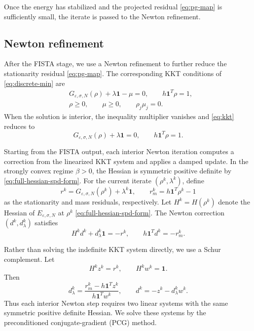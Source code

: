 \documentclass[11pt]{article}
\newcommand{\eps}{\varepsilon}
\newcommand{\sig}{\sigma}
\theoremstyle{plain}
\theoremstyle{definition}
\numberwithin{equation}{section}
\begin{document}
Once the energy has stabilized and the projected residual \eqref{eq:pg-map} is
sufficiently small, the iterate is passed to the Newton refinement.


\subsection{Newton refinement}
\label{subsec:Newton-PCG}

After the FISTA stage, we use a Newton refinement to further reduce
the stationarity residual \eqref{eq:pg-map}. The corresponding KKT conditions of
\eqref{eq:discrete-min} are 
\begin{equation}
\label{eq:kkt}
\begin{aligned}
& G_{\eps,\sig,N}(\rho)+\lambda\bm1-\mu=0,
\qquad
h\bm1^T\rho=1,\\
& \rho\ge0,\qquad
\mu\ge0,\qquad
\rho_j\mu_j=0.
\end{aligned}
\end{equation}
When the solution is interior, the inequality multiplier vanishes and
\eqref{eq:kkt} reduces to
\begin{equation}
\label{eq:interior-kkt}
G_{\eps,\sig,N}(\rho)+\lambda\bm1=0,
\qquad
h\bm1^T\rho=1.
\end{equation}

Starting from the FISTA output, each interior Newton iteration
computes a correction from the linearized KKT system and applies a
damped update. In the strongly convex regime $\beta>0$, the Hessian
is symmetric positive definite by
\eqref{eq:full-hessian-spd-form}. For the current iterate
$(\rho^k,\lambda^k)$, define
\[
r^k
=
G_{\eps,\sig,N}(\rho^k)+\lambda^k\bm1,
\qquad
r_m^k
=
h\bm1^T\rho^k-1
\]
as the stationarity and mass residuals, respectively.
Let $H^k=H(\rho^k)$ denote the Hessian of
$E_{\eps,\sig,N}$ at $\rho^k$ \eqref{eq:full-hessian-spd-form}.
The Newton correction
$(d^k,d_\lambda^k)$ satisfies
\[
H^kd^k+d_\lambda^k\bm1=-r^k,
\qquad
h\bm1^Td^k=-r_m^k.
\]

Rather than solving the indefinite KKT system directly, we use a
Schur complement. Let
\[
H^kz^k=r^k,
\qquad
H^kw^k=\bm1.
\]
Then
\begin{equation}
\label{eq:schur-two-solves}
d_\lambda^k
=
\frac{r_m^k-h\bm1^Tz^k}
     {h\bm1^Tw^k},
\qquad
d^k
=
-z^k-d_\lambda^kw^k.
\end{equation}
Thus each interior Newton step requires two linear systems with the
same symmetric positive definite Hessian. We solve these systems by
the preconditioned conjugate-gradient (PCG) method.
\end{document}

